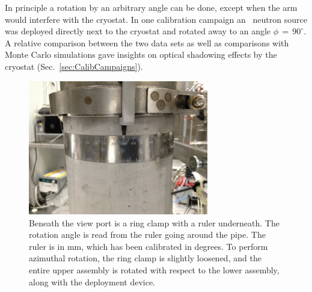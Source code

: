 In principle a rotation by an arbitrary angle can be done, except when the arm would interfere with the cryostat. In one calibration campaign an \AmBe\ neutron source was deployed directly next to the cryostat and rotated away to an angle $\phi\,=\,90^\circ$.  A relative comparison between the two data sets as well as comparisons with Monte Carlo simulations gave insights on optical shadowing effects by the cryostat (Sec.~\ref{sec:CalibCampaigns}). 



\begin{figure}[htbp]
 \centering
  \includegraphics[width=0.7\textwidth]{Figures/RingClamp_WithPin_IMG_2669.JPG}
  \caption{Beneath the view port is a ring clamp with a ruler underneath. The rotation angle is read from the ruler going around the pipe. The ruler is in mm, which has been calibrated in degrees. To perform azimuthal rotation, the ring clamp is slightly loosened, and the entire upper assembly is rotated with respect to the lower assembly, along with the deployment device.}
  \label{fig:ring_clamp}
\end{figure} 

